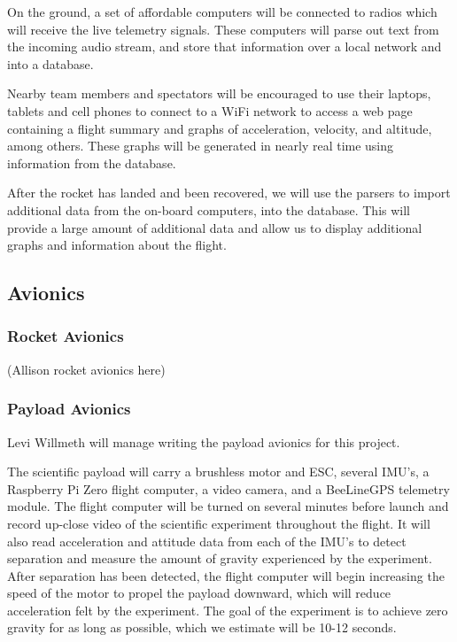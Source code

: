 \documentclass[onecolumn, draftclsnofoot, 10pt, compsoc]{IEEEtran}
\begin{document}
On the ground, a set of affordable computers will be connected to radios which will receive the live telemetry signals.  These computers will parse out text from the incoming audio stream, and store that information over a local network and into a database.

Nearby team members and spectators will be encouraged to use their laptops, tablets and cell phones to connect to a WiFi network to access a web page containing a flight summary and graphs of acceleration, velocity, and altitude, among others.  These graphs will be generated in nearly real time using information from the database.

After the rocket has landed and been recovered, we will use the parsers to import additional data from the on-board computers, into the database.  This will provide a large amount of additional data and allow us to display additional graphs and information about the flight.

\subsection{Avionics}

\subsubsection{Rocket Avionics}

(Allison rocket avionics here)

\subsubsection{Payload Avionics}

Levi Willmeth will manage writing the payload avionics for this project.

The scientific payload will carry a brushless motor and ESC, several IMU's, a Raspberry Pi Zero flight computer, a video camera, and a BeeLineGPS telemetry module.  The flight computer will be turned on several minutes before launch and record up-close video of the scientific experiment throughout the flight.  It will also read acceleration and attitude data from each of the IMU's to detect separation and measure the amount of gravity experienced by the experiment.  After separation has been detected, the flight computer will begin increasing the speed of the motor to propel the payload downward, which will reduce acceleration felt by the experiment.  The goal of the experiment is to achieve zero gravity for as long as possible, which we estimate will be 10-12 seconds.
\end{document}
